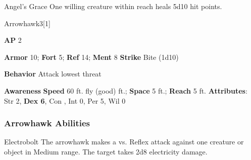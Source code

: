 \vspace{0.5em}
\begin{ability}{Angel's Grace}
One willing creature within reach heals 5d10 hit points.
\end{ability}






\begin{monsection}{Arrowhawk}{3}[1]
\vspace{-1em}\vspace{-1em}
\begin{spellcontent}
\begin{spelltargetinginfo}
{\textbf{AP} 2}

\pari \textbf{Armor} 10;
\textbf{Fort} 5;
\textbf{Ref} 14;
\textbf{Ment} 8
\pari \textbf{Strike} Bite  (1d10)



\pari \textbf{Behavior} Attack lowest threat
\end{spelltargetinginfo}
\end{spellcontent}

\begin{monsterfooter}
\pari \textbf{Awareness} 
\pari \textbf{Speed} 60 ft. fly (good) ft.;
\textbf{Space} 5 ft.;
\textbf{Reach} 5 ft.
\pari \textbf{Attributes}:
Str 2,
\textbf{Dex 6},
Con ,
Int 0,
Per 5,
Wil 0
\end{monsterfooter}
\end{monsection}


\subsubsection{Arrowhawk Abilities}

\begin{ability}{Electrobolt}
The arrowhawk makes a  vs. Reflex attack against one creature or object in Medium range.
\hit The target takes 2d8 electricity damage.
\end{ability}






